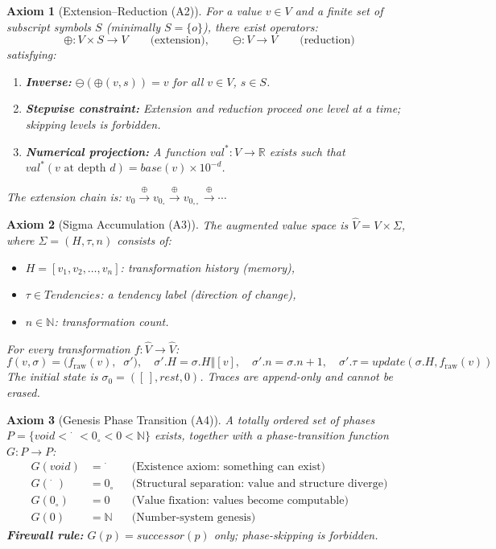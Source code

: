 \documentclass[11pt,a4paper]{article}
\newtheorem{axiom}{Axiom}
\newcommand{\Sig}{\Sigma}
\newcommand{\Vhat}{\hat{V}}
\newcommand{\extop}{\oplus}
\newcommand{\redop}{\ominus}
\newcommand{\zext}{0_\circ}
\begin{document}
\begin{axiom}[Extension--Reduction (A2)]
\label{ax:er}
For a value $v \in V$ and a finite set of subscript symbols $S$ (minimally $S = \{o\}$), there exist operators:
\[
  \extop : V \times S \to V \qquad\text{(extension)}, \qquad
  \redop : V \to V \qquad\text{(reduction)}
\]
satisfying:
\begin{enumerate}[label=(\alph*)]
  \item \textbf{Inverse:} $\redop(\extop(v, s)) = v$ for all $v \in V$, $s \in S$.
  \item \textbf{Stepwise constraint:} Extension and reduction proceed one level at a time; skipping levels is forbidden.
  \item \textbf{Numerical projection:} A function $\textit{val}^* : V \to \mathbb{R}$ exists such that $\textit{val}^*(v \text{ at depth } d) = \textit{base}(v) \times 10^{-d}$.
\end{enumerate}
The extension chain is: $v_0 \xrightarrow{\extop} v_{0_\circ} \xrightarrow{\extop} v_{0_{\circ\circ}} \xrightarrow{\extop} \cdots$
\end{axiom}

\begin{axiom}[Sigma Accumulation (A3)]
\label{ax:sigma}
The augmented value space is $\Vhat = V \times \Sig$, where $\Sig = (H, \tau, n)$ consists of:
\begin{itemize}[leftmargin=*]
  \item $H = [v_1, v_2, \ldots, v_n]$: transformation history (memory),
  \item $\tau \in \textit{Tendencies}$: a tendency label (direction of change),
  \item $n \in \mathbb{N}$: transformation count.
\end{itemize}
For every transformation $f : \Vhat \to \Vhat$:
\[
  f(v, \sigma) = \bigl(f_{\mathrm{raw}}(v),\;\; \sigma'\bigr), \quad
  \sigma'.H = \sigma.H \mathbin{\Vert} [v], \quad
  \sigma'.n = \sigma.n + 1, \quad
  \sigma'.\tau = \textit{update}(\sigma.H, f_{\mathrm{raw}}(v))
\]
The initial state is $\sigma_0 = ([\,], \textit{rest}, 0)$. Traces are append-only and cannot be erased.
\end{axiom}

\begin{axiom}[Genesis Phase Transition (A4)]
\label{ax:genesis}
A totally ordered set of phases $P = \{\textit{void} < \dot{\phantom{x}} < \zext < 0 < \mathbb{N}\}$ exists, together with a phase-transition function $G : P \to P$:
\begin{align*}
  G(\textit{void}) &= \dot{\phantom{x}} && \text{(Existence axiom: something can exist)} \\
  G(\dot{\phantom{x}}) &= \zext && \text{(Structural separation: value and structure diverge)} \\
  G(\zext) &= 0 && \text{(Value fixation: values become computable)} \\
  G(0) &= \mathbb{N} && \text{(Number-system genesis)}
\end{align*}
\textbf{Firewall rule:} $G(p) = \textit{successor}(p)$ only; phase-skipping is forbidden.
\end{axiom}
\end{document}
